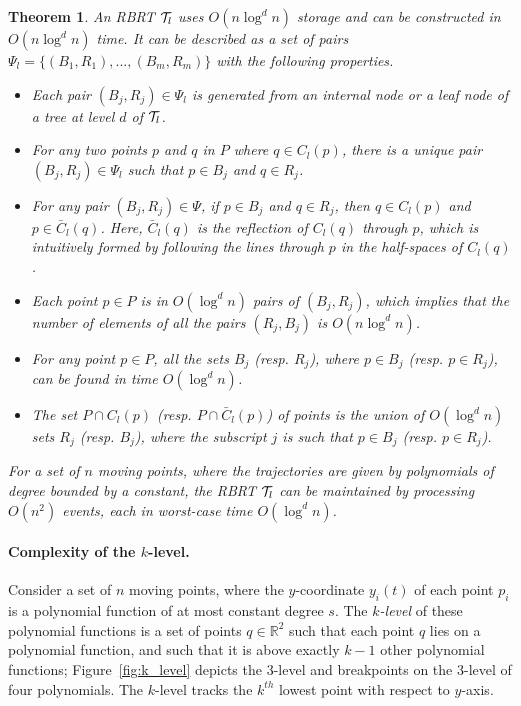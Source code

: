 \documentclass[preprint,12pt]{elsarticle}
\newtheorem{theorem}{Theorem}[section]
\begin{document}
\begin{theorem}\label{the:RBRTcomplexity}{\tt \cite{Abam:2011:KSX:1971362.1971367}}
An RBRT ${\cal T}_l$ uses $O(n\log^dn)$ storage and can be constructed in $O(n\log^d n)$ time. It can be described as a set of pairs $\Psi_l=\{(B_1,R_1),...,(B_m,R_m)\}$ with the following properties. 
\begin{itemize}
\item Each pair $(B_j,R_j)\in \Psi_l$ is generated from an internal node or a leaf node of a tree at level $d$ of ${\cal T}_l$.
\item For any two points $p$ and $q$ in $P$ where $q\in C_l(p)$, there is a unique pair $(B_j,R_j)\in \Psi_l$ such that $p\in B_j$ and $q\in R_j$.
\item For any pair $(B_j,R_j)\in \Psi$, if $p\in B_j$ and $q\in R_j$, then $q\in C_l(p)$ and $p\in \bar{C}_l(q)$. Here, $\bar{C}_l(q)$ is the reflection of $C_l(q)$ through $p$, which is intuitively formed by following the lines through $p$ in the half-spaces of $C_l(q)$.
\item Each point $p\in P$ is in $O(\log^d n)$ pairs of $(B_j,R_j)$, which implies that the number of elements of all the pairs $(R_j,B_j)$ is $O(n\log^d n)$.
\item For any point $p\in P$, all the sets $B_j$ (resp. $R_j$), where $p\in B_j$ (resp. $p\in R_j$), can be found in time $O(\log^d n)$.
\item The set $P\cap C_l(p)$ (resp. $P\cap \bar{C}_l(p)$) of points is the union of $O(\log^d n)$ sets $R_j$ (resp. $B_j$), where the subscript $j$ is such that $p\in B_j$ (resp. $p\in R_j$). 
\end{itemize}
For a set of $n$ moving points, where the trajectories are given by polynomials of degree bounded by a constant, the RBRT ${\cal T}_l$ can be maintained by processing $O(n^2)$ events, each in worst-case time $O(\log^d n)$.
\end{theorem}


\paragraph{Complexity of the $k$-level.} Consider a set of $n$ moving points, where the $y$-coordinate $y_i(t)$ of each point $p_i$ is a polynomial function of at most constant degree $s$. The \textit{$k$-level} of these polynomial functions is a set of points $q\in \mathbb{R}^2$ such that each point $q$ lies on a polynomial function, and such that it is above exactly $k-1$ other polynomial functions; Figure~\ref{fig:k_level} depicts the $3$-level and breakpoints on the $3$-level of four polynomials. The $k$-level tracks the $k^{th}$ lowest point with respect to $y$-axis.
\end{document}
